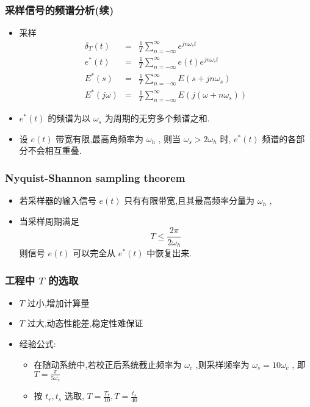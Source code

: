 \documentclass[table]{beamer}
\begin{document}
\begin{frame}
\frametitle{采样信号的频谱分析(续)}
\label{sec-2-1-4}


\begin{itemize}
\item 采样
      \begin{eqnarray*}
      \delta_T(t) &=& \frac{1}{T}\sum_{n=-\infty}^{\infty}e^{jn\omega_s t} \\
      e^*(t) &=& \frac{1}{T}\sum_{n=-\infty}^{\infty}e(t)e^{jn\omega_s t} \\
      E^*(s) &=& \frac{1}{T}\sum_{n=-\infty}^{\infty}E(s+jn\omega_s ) \\
      E^*(j\omega) &=& \frac{1}{T}\sum_{n=-\infty}^{\infty}E(j(\omega+n\omega_s)) 
      \end{eqnarray*}
\item <2->$e^*(t)$  的频谱为以  $\omega_s$  为周期的无穷多个频谱之和.
\item <3->设  $e(t)$ 带宽有限,最高角频率为  $\omega_h$ , 则当  $\omega_s>2\omega_h$  时,  $e^*(t)$  频谱的各部分不会相互重叠.
\end{itemize}
\end{frame}
\begin{frame}
\frametitle{Nyquist-Shannon sampling theorem}
\label{sec-2-1-5}

\begin{itemize}
\item <2->若采样器的输入信号  $e(t)$ 只有有限带宽,且其最高频率分量为  $\omega_h$  ,
\item <3->当采样周期满足  
	\[T\leq\frac{2\pi}{2\omega_h}\]  
    则信号  $e(t)$  可以完全从  $e^*(t)$  中恢复出来.
\end{itemize}
\end{frame}
\begin{frame}
\frametitle{工程中  $T$  的选取}
\label{sec-2-1-6}

\begin{itemize}
\item <2-> $T$  过小,增加计算量
\item <3-> $T$  过大,动态性能差,稳定性难保证
\item <4->经验公式:
\begin{itemize}
\item <4->在随动系统中,若校正后系统截止频率为  $\omega_c$ ,则采样频率为  $\omega_s=10\omega_c$  , 即  $T=\frac{\pi}{5\omega_c}$
\item <5->按  $t_r,t_s$  选取,   $T=\frac{T_r}{10},T=\frac{t_s}{40}$
\end{itemize}
\end{itemize}
\end{frame}
\end{document}

